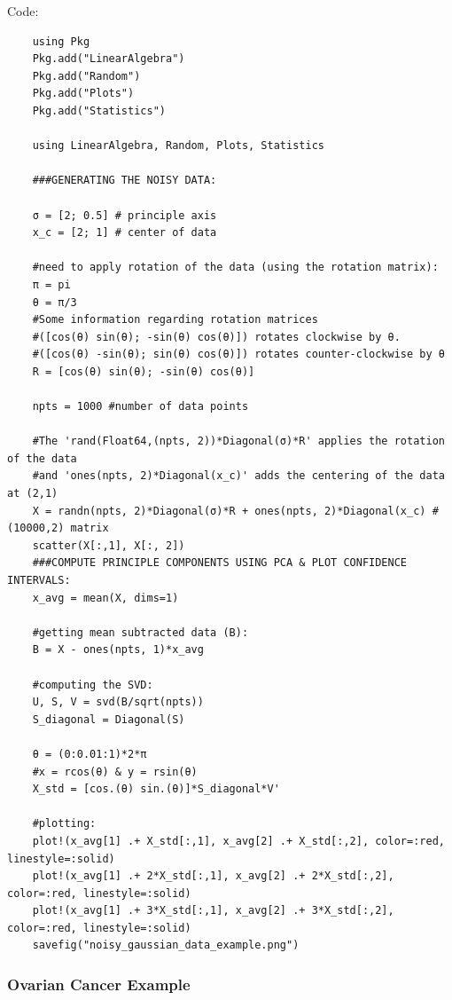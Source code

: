 \documentclass[11.5pt,a4paper]{article}
\begin{document}
Code:
\begin{verbatim}
    using Pkg
    Pkg.add("LinearAlgebra")
    Pkg.add("Random")
    Pkg.add("Plots")
    Pkg.add("Statistics")
    
    using LinearAlgebra, Random, Plots, Statistics
    
    ###GENERATING THE NOISY DATA:
    
    σ = [2; 0.5] # principle axis
    x_c = [2; 1] # center of data
    
    #need to apply rotation of the data (using the rotation matrix):
    π = pi
    θ = π/3
    #Some information regarding rotation matrices 
    #([cos(θ) sin(θ); -sin(θ) cos(θ)]) rotates clockwise by θ. 
    #([cos(θ) -sin(θ); sin(θ) cos(θ)]) rotates counter-clockwise by θ
    R = [cos(θ) sin(θ); -sin(θ) cos(θ)] 
    
    npts = 1000 #number of data points
    
    #The 'rand(Float64,(npts, 2))*Diagonal(σ)*R' applies the rotation of the data 
    #and 'ones(npts, 2)*Diagonal(x_c)' adds the centering of the data at (2,1)
    X = randn(npts, 2)*Diagonal(σ)*R + ones(npts, 2)*Diagonal(x_c) #(10000,2) matrix
    scatter(X[:,1], X[:, 2])
    ###COMPUTE PRINCIPLE COMPONENTS USING PCA & PLOT CONFIDENCE INTERVALS:
    x_avg = mean(X, dims=1)
    
    #getting mean subtracted data (B):
    B = X - ones(npts, 1)*x_avg
    
    #computing the SVD:
    U, S, V = svd(B/sqrt(npts))
    S_diagonal = Diagonal(S)
    
    θ = (0:0.01:1)*2*π
    #x = rcos(θ) & y = rsin(θ)
    X_std = [cos.(θ) sin.(θ)]*S_diagonal*V'
    
    #plotting:
    plot!(x_avg[1] .+ X_std[:,1], x_avg[2] .+ X_std[:,2], color=:red, linestyle=:solid)
    plot!(x_avg[1] .+ 2*X_std[:,1], x_avg[2] .+ 2*X_std[:,2], color=:red, linestyle=:solid)
    plot!(x_avg[1] .+ 3*X_std[:,1], x_avg[2] .+ 3*X_std[:,2], color=:red, linestyle=:solid)
    savefig("noisy_gaussian_data_example.png")
\end{verbatim}

\subsubsection*{Ovarian Cancer Example}
\end{document}
